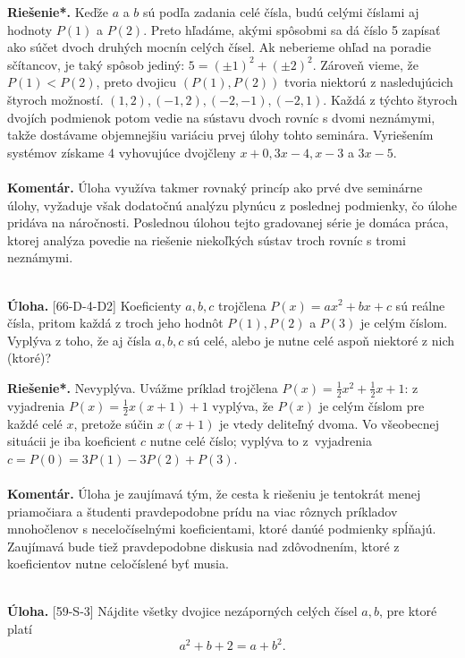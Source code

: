 \documentclass[11pt,a4paper,oneside,final]{book}
\newcommand{\kom}{\textbf{Komentár.} }
\newcommand{\ul}{\textbf{Úloha.} }
\newcommand{\rieh}{\textbf{Riešenie*.} }
\begin{document}
\rieh Keďže $a$ a $b$ sú podľa zadania celé čísla, budú celými číslami aj hodnoty $P(1)$ a $P(2)$. Preto hľadáme, akými spôsobmi sa dá číslo 5 zapísať ako súčet dvoch druhých mocnín celých čísel. Ak neberieme ohľad na poradie sčítancov, je taký spôsob jediný: $5 = (\pm 1)^2+ (\pm 2)^2$. Zároveň vieme, že $P(1)<P(2)$, preto dvojicu $(P(1), P(2))$ tvoria niektorú z nasledujúcich štyroch možností. $(1, 2), (-1, 2), (-2, -1), (-2, 1)$. Každá z týchto štyroch dvojích podmienok potom vedie na sústavu dvoch rovníc s dvomi neznámymi, takže dostávame objemnejšiu variáciu prvej úlohy tohto seminára. Vyriešením systémov získame 4 vyhovujúce dvojčleny $x + 0, 3x - 4, x - 3$ a $3x - 5$.\\
\\
\kom Úloha využíva takmer rovnaký princíp ako prvé dve seminárne úlohy, vyžaduje však dodatočnú analýzu plynúcu z poslednej podmienky, čo úlohe pridáva na náročnosti. Poslednou úlohou tejto gradovanej série je domáca práca, ktorej analýza povedie na riešenie niekoľkých sústav troch rovníc s tromi neznámymi.\\
\\
\begin{tcolorbox}[breakable,notitle,boxrule=0pt,colback=light-gray,colframe=light-gray]\ul [66-D-4-D2] Koeficienty $a, b, c$ trojčlena $P (x) = ax^2+ bx + c$ sú reálne čísla, pritom každá z troch jeho hodnôt $P (1), P (2)$ a $P (3)$ je celým číslom. Vyplýva z toho, že aj čísla $a, b, c$ sú celé, alebo je nutne celé aspoň niektoré z nich (ktoré)?

\end{tcolorbox}

\rieh Nevyplýva. Uvážme príklad trojčlena $P (x) =\frac{1}{2}x^2+\frac{1}{2}x+1$: z vyjadrenia $P (x) =\frac{1}{2}x(x + 1) + 1$ vyplýva, že $P (x)$ je celým číslom pre každé celé $x$, pretože súčin $x(x + 1)$ je vtedy deliteľný dvoma. Vo všeobecnej situácii je iba koeficient $c$ nutne celé číslo; vyplýva to z~vyjadrenia $c = P (0) = 3P (1) - 3P (2) + P (3)$.\\
\\
\kom Úloha je zaujímavá tým, že cesta k riešeniu je tentokrát menej priamočiara a študenti pravdepodobne prídu na viac rôznych príkladov mnohočlenov s neceločíselnými koeficientami, ktoré danúé podmienky spĺňajú. Zaujímavá bude tiež pravdepodobne diskusia nad zdôvodnením, ktoré z koeficientov nutne celočíslené byť musia.\\
\\
\begin{tcolorbox}[breakable,notitle,boxrule=0pt,colback=light-gray,colframe=light-gray]\ul [59-S-3] Nájdite všetky dvojice nezáporných celých čísel $a, b$, pre ktoré platí
$$a^2 + b + 2 = a + b^2.$$

\end{tcolorbox}
\end{document}
